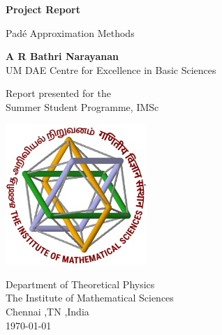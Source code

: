 \begin{titlepage}
	\begin{center}
		\vspace*{1cm}
		
		\Huge
		\textbf{Project Report}
		
		\vspace{0.5cm}
		\LARGE
		Pad\'e Approximation Methods
		
		\vspace{1.5cm}
		
		\textbf{A R Bathri Narayanan}\\
		UM DAE Centre for Excellence in Basic Sciences
		
		\vfill
		
		Report presented for the\\
		Summer Student Programme, IMSc
		
		\vspace{0.8cm}
		
		\includegraphics[width=0.4\textwidth]{imsc.png}
		
		\Large
		Department of Theoretical Physics\\
		The Institute of Mathematical Sciences\\
		Chennai ,TN ,India\\
		\today
		
	\end{center}
\end{titlepage}